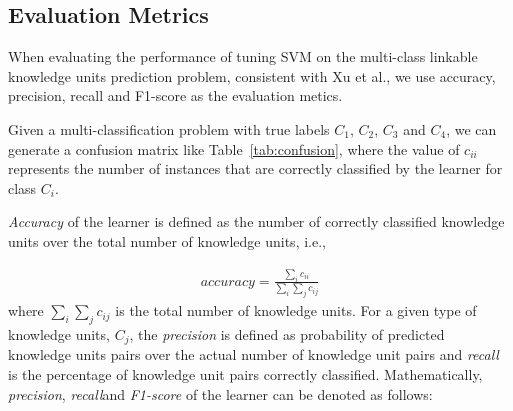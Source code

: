 \documentclass[sigconf,review, anonymous]{acmart}
\theoremstyle{break}
\newcommand{\tab}[1]{Table~\ref{tab:#1}}
\begin{document}
\subsection{Evaluation Metrics}
When evaluating the performance of tuning SVM on the
multi-class linkable knowledge units prediction problem,
consistent with Xu et al.\cite{xu2016predicting}, we use accuracy, precision, recall and F1-score
as the evaluation metics.

\begin{table}[htp]
\caption {Confusion Matrix.}
\scriptsize
{}

\label{tab:confusion}
\end{table}

Given a multi-classification problem with true labels $C_1$, 
$C_2$, $C_3$ and $C_4$, we can generate a confusion matrix like \tab{confusion}, 
where the value of $c_{ii}$ represents the number of instances that are correctly classified
by the learner for class $C_i$. 

{\it Accuracy} of the learner is defined as the number of  correctly
classified knowledge units over the total number of knowledge units, i.e.,


{\[
\begin{array}{ll}
accuracy = \frac{\sum_i c_{ii}}{\sum_{i}\sum_{j}c_{ij}}
\end{array}
\]}
where ${\sum_{i}\sum_{j}c_{ij}}$ is the total number of knowledge units.
For a given type of knowledge units, $C_j$, the {\it precision} is defined as probability of
predicted knowledge units pairs over the actual number of knowledge unit pairs and
 {\it recall} is the percentage of knowledge unit pairs correctly classified. Mathematically,
  {\it precision}, {\it recall}and {\it F1-score} of 
the learner can be denoted as follows:
\end{document}
